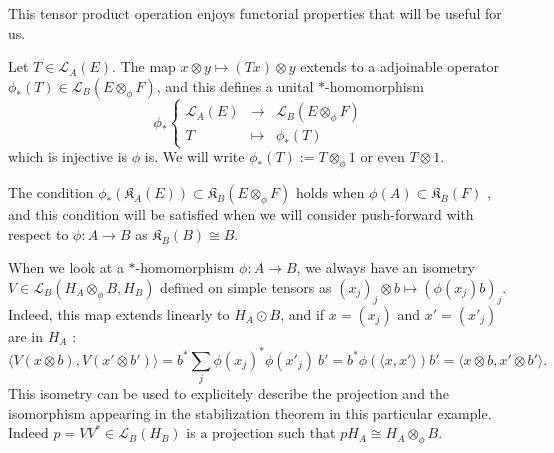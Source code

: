 This tensor product operation enjoys functorial properties that will be useful for us. 

\begin{prop}\cite{Lance}
Let $T\in\mathcal L_A(E)$. The map $x\otimes y \mapsto (Tx)\otimes y$ extends to a adjoinable operator $\phi_*(T)\in\mathcal L_B(E\otimes_\phi F)$, and this defines a unital $*$-homomorphism 
\[\phi_*\left\{\begin{array}{rcl} \mathcal L_A(E) & \rightarrow & \mathcal L_B(E\otimes_\phi F) \\ T & \mapsto & \phi_*(T)\end{array}\right.\]
which is injective is $\phi$ is. We will write $\phi_*(T) := T\otimes_\phi 1$ or even $T\otimes 1$. 
\end{prop} 

\begin{rk}
The condition $\phi_*(\mathfrak K_A(E))\subset \mathfrak K_B(E\otimes_\phi F)$ holds when $\phi(A)\subset \mathfrak K_B(F)$ \cite{Lance}, and this condition will be satisfied when we will consider push-forward with respect to $\phi : A\rightarrow B$ as $\mathfrak K_B(B) \cong B$. 
\end{rk}

\begin{rk}\label{isometry}
When we look at a $*$-homomorphism $\phi : A\rightarrow B$, we always have an isometry $V\in \mathcal L_B ( H_A\otimes_\phi B , H_B)$ defined on simple tensors as $(x_j)_j\otimes b \mapsto (\phi(x_j)b)_j$. Indeed, this map extends linearly to $H_A \odot B$, and if $x = (x_j)$ and $x'=(x'_j)$ are in $H_A$ : 
\[\langle V (x\otimes b) , V(x'\otimes b')\rangle = b^* \sum_j \phi(x_j)^* \phi(x'_j) \  b' = b^*\phi(\langle x, x' \rangle)b' = \langle x\otimes b , x'\otimes b' \rangle . \] %
This isometry can be used to explicitely describe the projection and the isomorphism appearing in the stabilization theorem in this particular example. Indeed $p = VV^*\in\mathcal L_B(H_B)$ is a projection such that $p H_A \cong H_A\otimes_\phi B $.  
\end{rk}


























